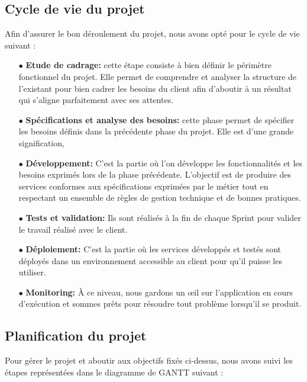 \subsection{Cycle de vie du projet}

\par Afin d’assurer le bon déroulement du projet, nous avons opté pour le cycle de vie suivant :
\begin{itemize}
    \item[$\bullet$] \textbf{Etude de cadrage:} cette étape consiste à bien définir le périmètre fonctionnel du projet. Elle permet de comprendre et analyser la structure de l’existant pour bien cadrer les besoins du client afin d’aboutir à un résultat qui s’aligne parfaitement avec ses attentes.
    \item[$\bullet$] \textbf{Spécifications et analyse des besoins:} cette phase permet de spécifier les besoins
définis dans la précédente phase du projet. Elle est d’une grande signification, 
    \item[$\bullet$] \textbf{Développement:} C'est la partie où l'on développe les fonctionnalités et les besoins exprimés lors de la phase précédente. L'objectif est de produire des services conformes aux spécifications exprimées par le métier tout en respectant un ensemble de règles de gestion technique et de bonnes pratiques.
    \item[$\bullet$] \textbf{Tests et validation:} Ils sont réalisés à la fin de chaque Sprint pour valider le travail réalisé avec le client.
    \item[$\bullet$] \textbf{Déploiement:} C'est la partie où les services développés et testés sont déployés dans un environnement accessible au client pour qu'il puisse les utiliser.
    \item[$\bullet$] \textbf{Monitoring:} À ce niveau, nous gardons un œil sur l'application en cours d'exécution et sommes prêts pour résoudre tout problème lorsqu'il se produit. 
\end{itemize}


\subsection{Planification du projet}
Pour gérer le projet et aboutir aux objectifs fixés ci-dessus, nous avons suivi les étapes représentées dans le diagramme de GANTT suivant :

